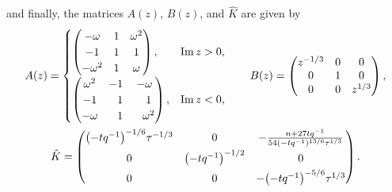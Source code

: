 \documentclass[10pt,a4paper]{amsart}
\begin{document}
\begin{Proposition}
\begin{enumerate}
\begin{equation*}
 \end{equation*}
and finally, the matrices $A(z)$, $B(z)$, and $\hat{K}$ are given by
 \begin{gather*}
 A(z) =
 \begin{cases}
 \begin{pmatrix}
 -\omega & 1 & \omega^2\\
 -1 & 1 & 1\\
 -\omega^2 & 1 & \omega
 \end{pmatrix}, & \operatorname{Im} z > 0,\\[2.5mm]
 \begin{pmatrix}
 \omega^2 & -1 & -\omega\\
 -1 & \hphantom{-}1 & \hphantom{-}1\\
 -\omega & \hphantom{-}1 & \hphantom{-}\omega^2\\
 \end{pmatrix}, & \operatorname{Im} z < 0,
 \end{cases}
 \qquad
 B(z) =
 \begin{pmatrix}
 z^{-1/3} & 0 & 0\\
 0 & 1 & 0\\
 0 & 0 & z^{1/3}
 \end{pmatrix},
 \\
 \hat{K} =
 \begin{pmatrix}
 \bigl(-tq^{-1}\bigr)^{-1/6}\tau^{-1/3} & 0 & -\frac{n+27 tq^{-1}}{54(-tq^{-1})^{13/6}\tau^{1/3}}\\[1.4mm]
 0 & \bigl(-tq^{-1}\bigr)^{-1/2} & 0\\[1.1mm]
 0 & 0 & -\bigl(-tq^{-1}\bigr)^{-5/6}\tau^{1/3}
 \end{pmatrix}.
 \end{gather*}
 \end{enumerate}
 \end{Proposition}
\end{document}

